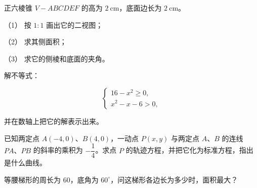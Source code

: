 \begin{question}
正六棱锥 $V-ABCDEF$ 的高为 $2\ \mathrm{cm}$，底面边长为 $2\ \mathrm{cm}$。

（1） 按 $1:1$ 画出它的二视图；

（2） 求其侧面积；

（3） 求它的侧棱和底面的夹角。

\end{question}
\begin{question}
解不等式：

\nopagebreak[4]
\[
\begin{cases}
16-x^2\geqslant0,\\
x^2-x-6>0,
\end{cases}
\]

并在数轴上把它的解表示出来。

\end{question}
\begin{question}
已知两定点 $A(-4,0)$、$B(4,0)$，一动点 $P(x,y)$ 与两定点 $A\text{、}B$ 的连线 $PA\text{、}PB$ 的斜率的乘积为 $-\dfrac14$。求点 $P$ 的轨迹方程，并把它化为标准方程，指出是什么曲线。

\Needspace{0.4\textheight}
\end{question}
\begin{question}
等腰梯形的周长为 $60$，底角为 $60^\circ$，问这梯形各边长为多少时，面积最大？
\nopagebreak[4]
\begin{center}\end{center}
\nopagebreak[4]
\Needspace{0.4\textheight}
\end{question}
